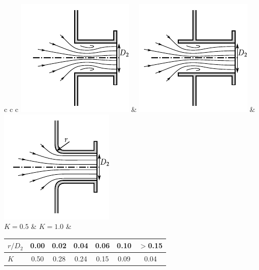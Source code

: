 \begin{minipage}{\textwidth}
	\begin{tabular}[t]{c c c}
		\includegraphics{fig/appendix/Instroming}
		&
		\includegraphics{fig/appendix/Buis_instroming}
		&
		\includegraphics{fig/appendix/Afgeronde_instroming}
		\\
		$K = 0.5$  & $K = 1.0$ & 
		\begin{tabular}{l c c c c c c}
			$r/D_2$ & 0.00 & 0.02 & 0.04 & 0.06 & 0.10 & $>$0.15  \\ 
			\hline
			$K$    & 0.50    & 0.28    & 0.24      & 0.15    & 0.09     & 0.04  \\
		\end{tabular}
	\end{tabular}
\end{minipage}
\vspace{1cm}


